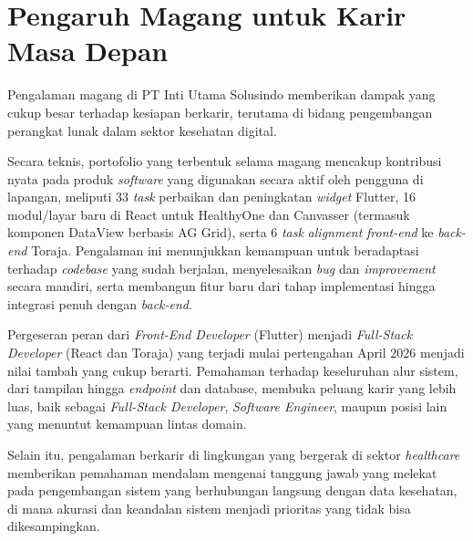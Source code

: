 \section{Pengaruh Magang untuk Karir Masa Depan}

Pengalaman magang di PT Inti Utama Solusindo memberikan dampak yang cukup besar
terhadap kesiapan berkarir, terutama di bidang pengembangan perangkat lunak
dalam sektor kesehatan digital.

Secara teknis, portofolio yang terbentuk selama magang mencakup kontribusi
nyata pada produk \textit{software} yang digunakan secara aktif oleh pengguna
di lapangan, meliputi 33 \textit{task} perbaikan dan peningkatan
\textit{widget} Flutter, 16 modul/layar baru di React untuk HealthyOne dan
Canvasser (termasuk komponen DataView berbasis AG Grid), serta 6 \textit{task}
\textit{alignment} \textit{front-end} ke \textit{back-end} Toraja. Pengalaman
ini menunjukkan kemampuan untuk beradaptasi terhadap \textit{codebase} yang
sudah berjalan, menyelesaikan \textit{bug} dan \textit{improvement} secara
mandiri, serta membangun fitur baru dari tahap implementasi hingga integrasi
penuh dengan \textit{back-end}.

Pergeseran peran dari \textit{Front-End Developer} (Flutter) menjadi
\textit{Full-Stack Developer} (React dan Toraja) yang terjadi mulai pertengahan
April 2026 menjadi nilai tambah yang cukup berarti. Pemahaman terhadap
keseluruhan alur sistem, dari tampilan hingga \textit{endpoint} dan database,
membuka peluang karir yang lebih luas, baik sebagai \textit{Full-Stack
    Developer}, \textit{Software Engineer}, maupun posisi lain yang menuntut
kemampuan lintas domain.

Selain itu, pengalaman berkarir di lingkungan yang bergerak di sektor
\textit{healthcare} memberikan pemahaman mendalam mengenai tanggung jawab yang
melekat pada pengembangan sistem yang berhubungan langsung dengan data
kesehatan, di mana akurasi dan keandalan sistem menjadi prioritas yang tidak
bisa dikesampingkan.
